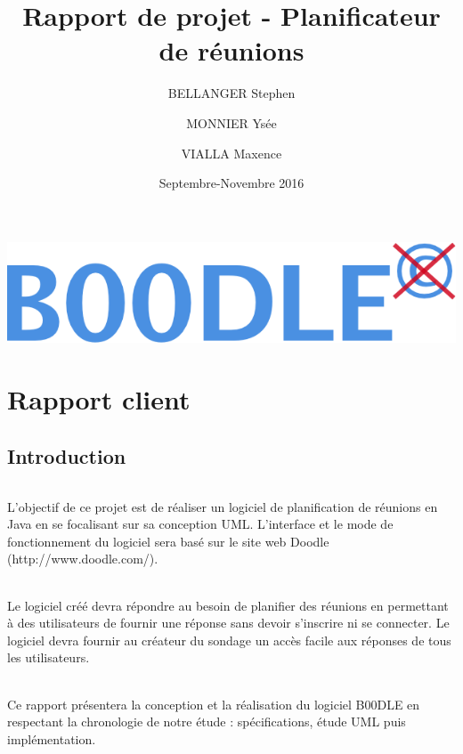 \documentclass[]{report}
\title{Rapport de projet - Planificateur de réunions}
\author{BELLANGER Stephen \and
		MONNIER Ysée \and
		VIALLA Maxence}
\date{Septembre-Novembre 2016}
\begin{document}
\begin{titlepage}
	\begin{center}
	
	\includegraphics[scale=0.5]{figures/Logo_B00DLE.png}
	\maketitle
	\end{center}
\end{titlepage}
\part{Rapport client}

\tableofcontents

\listoffigures 

\chapter{Introduction}

\paragraph{}
	L'objectif de ce projet est de réaliser un logiciel de planification de réunions en Java en se focalisant sur sa conception UML. L'interface et le mode de fonctionnement du logiciel sera basé sur le site web Doodle (http://www.doodle.com/). 
	\paragraph{}
	Le logiciel créé devra répondre au besoin de planifier des réunions en permettant à des utilisateurs de fournir une réponse sans devoir s'inscrire ni se connecter. Le logiciel devra fournir au créateur du sondage un accès facile aux réponses de tous les utilisateurs.
	\paragraph{}
	Ce rapport présentera la conception et la réalisation du logiciel B00DLE en respectant la chronologie de notre étude : spécifications, étude UML puis implémentation.
\end{document}
